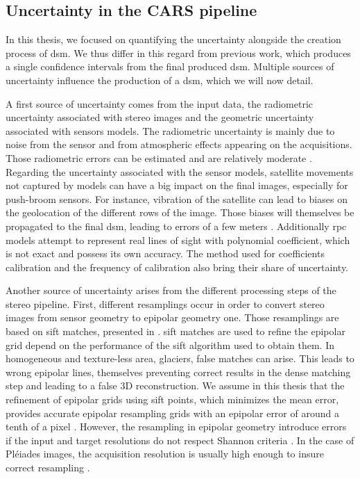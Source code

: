 \subsection{Uncertainty in the CARS pipeline}\label{sec:uncertainty_cars}
In this thesis, we focused on quantifying the uncertainty alongside the creation process of \acrshort{dsm}. We thus differ in this regard from previous work, which produces a single confidence intervals from the final produced \acrshort{dsm}. Multiple sources of uncertainty influence the production of a \acrshort{dsm}, which we will now detail.

A first source of uncertainty comes from the input data, \ie the radiometric uncertainty associated with stereo images and the geometric uncertainty associated with sensors models. The radiometric uncertainty is mainly due to noise from the sensor and from atmospheric effects appearing on the acquisitions. Those radiometric errors can be estimated and are relatively moderate \cite{jacobsen_radiometric_2014}. Regarding the uncertainty associated with the sensor models, satellite movements not captured by models can have a big impact on the final images, especially for push-broom sensors. For instance, vibration of the satellite can lead to biases on the geolocation of the different rows of the image. Those biases will themselves be propagated to the final \acrshort{dsm}, leading to errors of a few meters \cite{loghin_accuracy_2019}. Additionally \acrshort{rpc} models attempt to represent real lines of sight with polynomial coefficient, which is not exact and possess its own accuracy. The method used for coefficients calibration and the frequency of calibration also bring their share of uncertainty. 

Another source of uncertainty arises from the different processing steps of the stereo pipeline. First, different resamplings occur in order to convert stereo images from sensor geometry to epipolar geometry one. Those resamplings are based on \acrshort{sift} matches, presented in . \acrshort{sift} matches are used to refine the epipolar grid depend on the performance of the \acrshort{sift} algorithm used to obtain them. In homogeneous and texture-less area, \eg glaciers, false matches can arise. This leads to wrong epipolar lines, themselves preventing correct results in the dense matching step and leading to a false 3D reconstruction.  We assume in this thesis that the refinement of epipolar grids using \acrshort{sift} points, which minimizes the mean error, provides accurate epipolar resampling grids with an epipolar error of around a tenth of a pixel \cite{franchis_automatic_2014}. However, the resampling in epipolar geometry introduce errors if the input and target resolutions do not respect Shannon criteria \cite{delon_small_2007}. In the case of Pléiades images, the acquisition resolution is usually high enough to insure correct resampling \cite{jacobsen_radiometric_2014}. 

